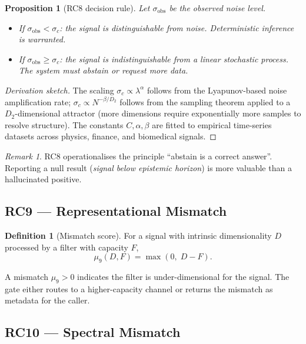 \documentclass[12pt,a4paper]{article}
\theoremstyle{plain}
\newtheorem{proposition}[theorem]{Proposition}
\theoremstyle{definition}
\newtheorem{definition}[theorem]{Definition}
\theoremstyle{remark}
\newtheorem{remark}[theorem]{Remark}
\begin{document}
\begin{proposition}[RC8 decision rule]
\label{prop:rc8-decision}
Let $\sigma_{\text{obs}}$ be the observed noise level.
\begin{itemize}[noitemsep]
  \item If $\sigma_{\text{obs}} < \sigma_c$: the signal is
    \emph{distinguishable} from noise.  Deterministic inference is
    warranted.
  \item If $\sigma_{\text{obs}} \geq \sigma_c$: the signal is
    \emph{indistinguishable} from a linear stochastic process.
    The system must abstain or request more data.
\end{itemize}
\end{proposition}

\begin{proof}[Derivation sketch]
The scaling $\sigma_c \propto \lambda^\alpha$ follows from the
Lyapunov-based noise amplification rate; $\sigma_c \propto N^{-\beta/D_2}$
follows from the sampling theorem applied to a $D_2$-dimensional
attractor (more dimensions require exponentially more samples to resolve
structure).  The constants $C,\alpha,\beta$ are fitted to empirical
time-series datasets across physics, finance, and biomedical signals.
\end{proof}

\begin{remark}
RC8 operationalises the principle ``abstain is a correct answer''.
Reporting a null result (\emph{signal below epistemic horizon}) is
more valuable than a hallucinated positive.
\end{remark}

\subsection{RC9 --- Representational Mismatch}
\label{sec:rc9}

\begin{definition}[Mismatch score]
For a signal with intrinsic dimensionality $D$ processed by a filter
with capacity $F$,
\begin{equation}
\mu_9(D,F) = \max(0,\; D - F).
\label{eq:rc9}
\end{equation}
\end{definition}

A mismatch $\mu_9 > 0$ indicates the filter is under-dimensional for
the signal.  The gate either routes to a higher-capacity channel or
returns the mismatch as metadata for the caller.

\subsection{RC10 --- Spectral Mismatch}
\label{sec:rc10}
\end{document}
